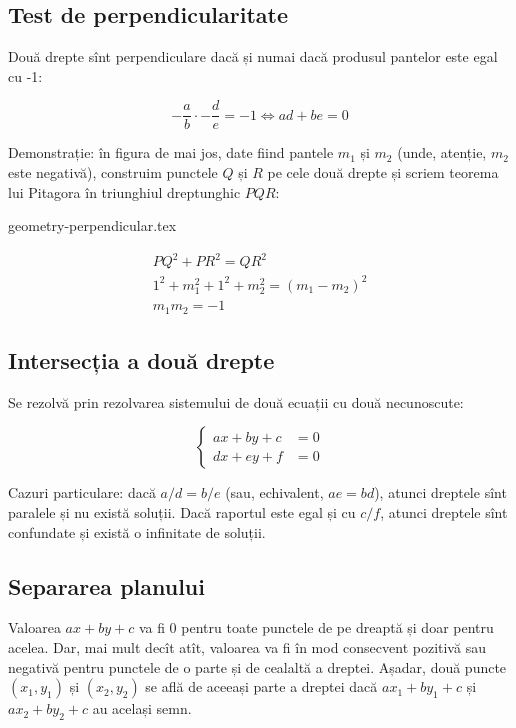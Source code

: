 \documentclass[../main.tex]{subfiles}
\begin{document}
\subsection{Test de perpendicularitate}

Două drepte sînt perpendiculare dacă și numai dacă produsul pantelor este egal cu -1:

$$ -\frac{a}{b} \cdot -\frac{d}{e} = -1 \iff ad + be = 0$$

Demonstrație: în figura de mai jos, date fiind pantele $m_1$ și $m_2$ (unde, atenție, $m_2$ este negativă), construim punctele $Q$ și $R$ pe cele două drepte și scriem teorema lui Pitagora în triunghiul dreptunghic $PQR$:

{geometry-perpendicular.tex}

\begin{gather*}
PQ^2 + PR^2 = QR^2\\
1^2 + m_1^2 + 1^2 + m_2^2 = (m_1 - m_2)^2\\
m_1 m_2 = -1
\end{gather*}

\subsection{Intersecția a două drepte}

Se rezolvă prin rezolvarea sistemului de două ecuații cu două necunoscute:

$$
\begin{cases}
a x + b y + c &= 0 \\
d x + e y + f &= 0
\end{cases}
$$

Cazuri particulare: dacă $a / d = b / e$ (sau, echivalent, $ae = bd$), atunci dreptele sînt paralele și nu există soluții. Dacă raportul este egal și cu $c / f$, atunci dreptele sînt confundate și există o infinitate de soluții.

\subsection{Separarea planului}

Valoarea $ax + by + c$ va fi 0 pentru toate punctele de pe dreaptă și doar pentru acelea. Dar, mai mult decît atît, valoarea va fi în mod consecvent pozitivă sau negativă pentru punctele de o parte și de cealaltă a dreptei. Așadar, două puncte $(x_1, y_1)$ și $(x_2, y_2)$ se află de aceeași parte a dreptei dacă $ax_1 + by_1 + c$ și $ax_2 + by_2 + c$ au același semn.
\end{document}

